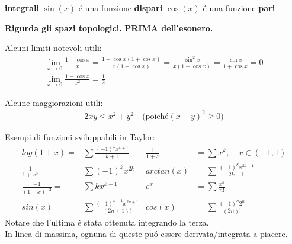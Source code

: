 \documentclass[a4paper,10pt]{article} %
\newcommand{\msection}[1]{%
    {\newpage\par \hfil }}
\renewcommand{\b}[1]{%
    {\textbf{#1}}}
\begin{document}
\begin{multicols}{6}






\end{multicols}
\msection{}
\begin{multicols}{4} 

\b{integrali}
    $\sin(x)$ \'{e} una funzione \b{dispari}
    $\cos(x)$ \'{e} una funzione \b{pari}
\smallbreak
\end{multicols}

\Huge{ 
\b{Rigurda gli spazi topologici.}
\b{PRIMA dell'esonero.}
}

Alcuni limiti notevoli utili:
\begin{gather*}
    \lim_{x \rightarrow 0} \frac{1-\cos x}{x} =
    \frac{1 - \cos x(1+\cos x)}{x(1+\cos x)} =
    \frac{\sin^2 x}{x(1+\cos x)} =
    \frac{\sin x}{1+\cos x} = 0 \\
    \lim_{x \rightarrow 0} \frac{1-\cos x}{x^2} =
    \frac{1}{2}
\end{gather*}

Alcune maggiorazioni utili:
\begin{gather*}
    2xy \leq x^2 + y^2 \quad \text{(poich\'e} (x-y)^2 \geq 0)
\end{gather*}


Esempi di funzioni sviluppabili in Taylor:
\begin{align*}
    log(1+x)=&\sum \frac{(-1)^k x^{k+1}}{k+1} 
    &\frac{1}{1+x}& = \sum x^k, \quad x \in (-1, 1)
    \\
    \frac{1}{1+x^2} = &\sum (-1)^k x^{2k} 
    &arctan(x)&= \sum \frac { (-1)^k x^{2k + 1}}{ 2k+1}
    \\
    \frac{-1}{(1 - x)^{-2}} = &\sum kx^{k-1} 
    &e^x &= \sum \frac{x^n}{n!}
    \\
    sin(x) =&\sum\frac{(-1)^{n+1}x^{2n +1}}{(2n +1)!} 
    &cos(x) &= \sum\frac{(-1)^{n}2^n}{(2n)!}
\end{align*}
Notare che l'ultima \'{e} stata ottenuta integrando la terza.\\
In linea di massima, ognuna di queste pu\'{o} essere derivata/integrata a piacere.

\end{document}
